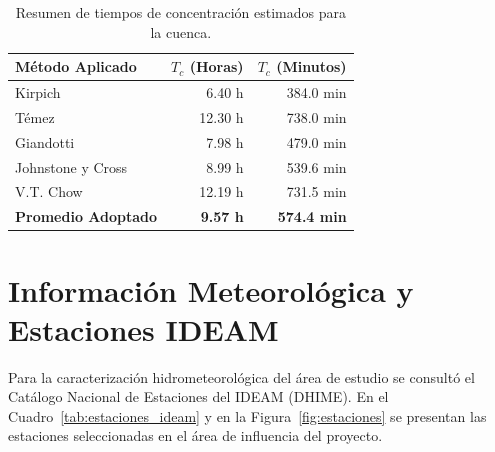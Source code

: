 \documentclass[11pt,a4paper]{article}
\begin{document}
\begin{table}[H]
\centering
\caption{Resumen de tiempos de concentración estimados para la cuenca.}
\label{tab:tc_resultados}
\begin{tabular}{lrr}\toprule
\textbf{Método Aplicado} & \textbf{$T_c$ (Horas)} & \textbf{$T_c$ (Minutos)} \\\midrule
Kirpich & 6.40 h & 384.0 min \\
Témez & 12.30 h & 738.0 min \\
Giandotti & 7.98 h & 479.0 min \\
Johnstone y Cross & 8.99 h & 539.6 min \\
V.T. Chow & 12.19 h & 731.5 min \\
\midrule
\textbf{Promedio Adoptado} & \textbf{9.57 h} & \textbf{574.4 min} \\
\bottomrule
\end{tabular}
\end{table}

\section{Información Meteorológica y Estaciones IDEAM}
Para la caracterización hidrometeorológica del área de estudio se consultó el Catálogo Nacional de Estaciones del IDEAM (DHIME). En el Cuadro~\ref{tab:estaciones_ideam} y en la Figura~\ref{fig:estaciones} se presentan las estaciones seleccionadas en el área de influencia del proyecto.

\begin{table}[H]
\centering
\caption{Estaciones meteorológicas oficiales del IDEAM identificadas en el área de influencia.}
\label{tab:estaciones_ideam}
\end{table}
\end{document}
